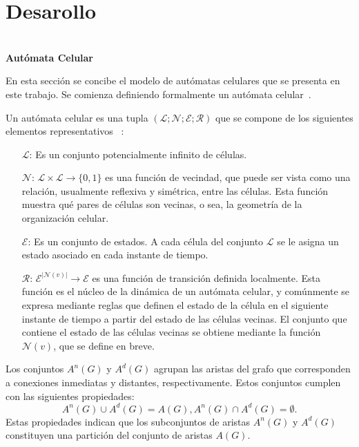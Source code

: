 \documentclass[a4paper,11pt]{article}
\begin{document}
{\section*{Desarollo}

\\
\textbf{Aut\'omata Celular}

En esta secci\'on se concibe el modelo de aut\'omatas celulares que se presenta en este trabajo. Se comienza definiendo formalmente un aut\'omata celular~\cite{7}.

Un aut\'omata celular es una tupla $(\mathcal{L}; \mathcal{N}; \mathcal{E}; \mathcal{R})$ que se compone de los siguientes elementos representativos ~\cite{2}:
\begin{itemize}
\item [$\mathcal{L}$:] Es un conjunto potencialmente infinito de c\'elulas.
\item [$\mathcal{N}$:] $\mathcal{L} \times \mathcal{L} \rightarrow \lbrace 0,1 \rbrace$ es una funci\'on de vecindad, que puede ser vista como una relaci\'on, usualmente reflexiva y sim\'etrica, entre las c\'elulas. Esta funci\'on muestra qu\'e pares de c\'elulas son vecinas, o sea, la geometr\'ia de la organizaci\'on celular.
\item [$\mathcal{E}$:]  Es un conjunto de estados. A cada c\'elula del conjunto $\mathcal{L}$ se le asigna un estado asociado en cada instante de tiempo.
\item [$\mathcal{R}$:] $\mathcal{E}^{|\mathcal{N}(v)|} \rightarrow \mathcal{E}$ es una funci\'on de transici\'on definida localmente. Esta funci\'on es el n\'ucleo de la din\'amica de un aut\'omata celular, y com\'unmente se expresa mediante reglas que definen el estado de la c\'elula en el siguiente instante de tiempo a partir del estado de las c\'elulas vecinas. El conjunto que contiene el estado de las c\'elulas vecinas se obtiene mediante la funci\'on $\mathcal{N}(v)$, que se define en breve.
\end{itemize}

Los conjuntos $A^n(G)$ y $A^d(G)$ agrupan las aristas del grafo que corresponden a conexiones inmediatas y distantes, respectivamente. Estos conjuntos cumplen con las siguientes propiedades:
\begin{subequations}
\begin{equation}
A^n(G) \cup A^d(G) = A(G),
\end{equation}
\begin{equation}
A^n(G) \cap A^d(G) = \emptyset.
\end{equation}
\end{subequations}
Estas propiedades indican que los subconjuntos de aristas $A^n(G)$ y $A^d(G)$ constituyen una partición del conjunto de aristas $A(G)$.

}
\end{document}
